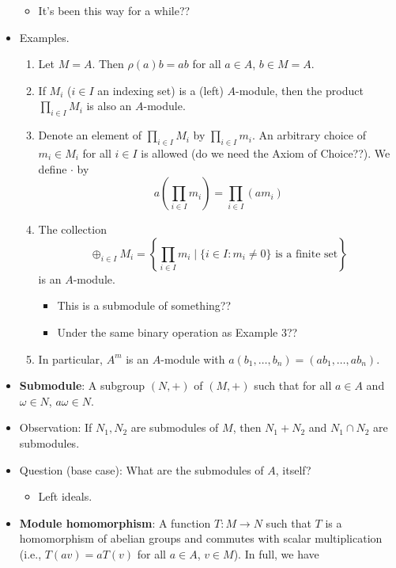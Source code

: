 \documentclass[../notes.tex]{subfiles}
\begin{document}
\begin{itemize}
\begin{itemize}
        \item It's been this way for a while??
    \end{itemize}
    \item Examples.
    \begin{enumerate}
        \item Let $M=A$. Then $\rho(a)b=ab$ for all $a\in A$, $b\in M=A$.
        \item If $M_i$ ($i\in I$ an indexing set) is a (left) $A$-module, then the product $\prod_{i\in I}M_i$ is also an $A$-module.
        \item Denote an element of $\prod_{i\in I}M_i$ by $\prod_{i\in I}m_i$. An arbitrary choice of $m_i\in M_i$ for all $i\in I$ is allowed (do we need the Axiom of Choice??). We define $\cdot$ by
        \begin{equation*}
            a\left( \prod_{i\in I}m_i \right) = \prod_{i\in I}(am_i)
        \end{equation*}
        \item The collection
        \begin{equation*}
            \oplus_{i\in I}M_i = \left\{ \prod_{i\in I}m_i\mid\{i\in I:m_i\neq 0\}\text{ is a finite set} \right\}
        \end{equation*}
        is an $A$-module.
        \begin{itemize}
            \item This is a submodule of something??
            \item Under the same binary operation as Example 3??
        \end{itemize}
        \item In particular, $A^m$ is an $A$-module with $a(b_1,\dots,b_n)=(ab_1,\dots,ab_n)$.
    \end{enumerate}
    \item \textbf{Submodule}: A subgroup $(N,+)$ of $(M,+)$ such that for all $a\in A$ and $\omega\in N$, $a\omega\in N$.
    \item Observation: If $N_1,N_2$ are submodules of $M$, then $N_1+N_2$ and $N_1\cap N_2$ are submodules.
    \item Question (base case): What are the submodules of $A$, itself?
    \begin{itemize}
        \item Left ideals.
    \end{itemize}
    \item \textbf{Module homomorphism}: A function $T:M\to N$ such that $T$ is a homomorphism of abelian groups and commutes with scalar multiplication (i.e., $T(av)=aT(v)$ for all $a\in A$, $v\in M$). In full, we have

\end{itemize}
\end{document}
